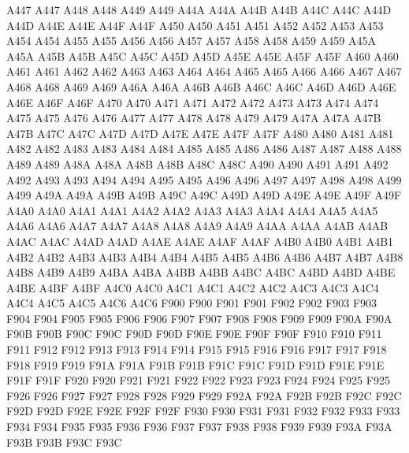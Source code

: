 \ID A447 A447
\ID A448 A448
\ID A449 A449
\ID A44A A44A
\ID A44B A44B
\ID A44C A44C
\ID A44D A44D
\ID A44E A44E
\ID A44F A44F
\ID A450 A450
\ID A451 A451
\ID A452 A452
\ID A453 A453
\ID A454 A454
\ID A455 A455
\ID A456 A456
\ID A457 A457
\ID A458 A458
\ID A459 A459
\ID A45A A45A
\ID A45B A45B
\ID A45C A45C
\ID A45D A45D
\ID A45E A45E
\ID A45F A45F
\ID A460 A460
\ID A461 A461
\ID A462 A462
\ID A463 A463
\ID A464 A464
\ID A465 A465
\ID A466 A466
\ID A467 A467
\ID A468 A468
\ID A469 A469
\ID A46A A46A
\ID A46B A46B
\ID A46C A46C
\ID A46D A46D
\ID A46E A46E
\ID A46F A46F
\ID A470 A470
\ID A471 A471
\ID A472 A472
\ID A473 A473
\ID A474 A474
\ID A475 A475
\ID A476 A476
\ID A477 A477
\ID A478 A478
\ID A479 A479
\ID A47A A47A
\ID A47B A47B
\ID A47C A47C
\ID A47D A47D
\ID A47E A47E
\ID A47F A47F
\ID A480 A480
\ID A481 A481
\ID A482 A482
\ID A483 A483
\ID A484 A484
\ID A485 A485
\ID A486 A486
\ID A487 A487
\ID A488 A488
\ID A489 A489
\ID A48A A48A
\ID A48B A48B
\ID A48C A48C
\ID A490 A490
\ID A491 A491
\ID A492 A492
\ID A493 A493
\ID A494 A494
\ID A495 A495
\ID A496 A496
\ID A497 A497
\ID A498 A498
\ID A499 A499
\ID A49A A49A
\ID A49B A49B
\ID A49C A49C
\ID A49D A49D
\ID A49E A49E
\ID A49F A49F
\ID A4A0 A4A0
\ID A4A1 A4A1
\ID A4A2 A4A2
\ID A4A3 A4A3
\ID A4A4 A4A4
\ID A4A5 A4A5
\ID A4A6 A4A6
\ID A4A7 A4A7
\ID A4A8 A4A8
\ID A4A9 A4A9
\ID A4AA A4AA
\ID A4AB A4AB
\ID A4AC A4AC
\ID A4AD A4AD
\ID A4AE A4AE
\ID A4AF A4AF
\ID A4B0 A4B0
\ID A4B1 A4B1
\ID A4B2 A4B2
\ID A4B3 A4B3
\ID A4B4 A4B4
\ID A4B5 A4B5
\ID A4B6 A4B6
\ID A4B7 A4B7
\ID A4B8 A4B8
\ID A4B9 A4B9
\ID A4BA A4BA
\ID A4BB A4BB
\ID A4BC A4BC
\ID A4BD A4BD
\ID A4BE A4BE
\ID A4BF A4BF
\ID A4C0 A4C0
\ID A4C1 A4C1
\ID A4C2 A4C2
\ID A4C3 A4C3
\ID A4C4 A4C4
\ID A4C5 A4C5
\ID A4C6 A4C6
\ID F900 F900
\ID F901 F901
\ID F902 F902
\ID F903 F903
\ID F904 F904
\ID F905 F905
\ID F906 F906
\ID F907 F907
\ID F908 F908
\ID F909 F909
\ID F90A F90A
\ID F90B F90B
\ID F90C F90C
\ID F90D F90D
\ID F90E F90E
\ID F90F F90F
\ID F910 F910
\ID F911 F911
\ID F912 F912
\ID F913 F913
\ID F914 F914
\ID F915 F915
\ID F916 F916
\ID F917 F917
\ID F918 F918
\ID F919 F919
\ID F91A F91A
\ID F91B F91B
\ID F91C F91C
\ID F91D F91D
\ID F91E F91E
\ID F91F F91F
\ID F920 F920
\ID F921 F921
\ID F922 F922
\ID F923 F923
\ID F924 F924
\ID F925 F925
\ID F926 F926
\ID F927 F927
\ID F928 F928
\ID F929 F929
\ID F92A F92A
\ID F92B F92B
\ID F92C F92C
\ID F92D F92D
\ID F92E F92E
\ID F92F F92F
\ID F930 F930
\ID F931 F931
\ID F932 F932
\ID F933 F933
\ID F934 F934
\ID F935 F935
\ID F936 F936
\ID F937 F937
\ID F938 F938
\ID F939 F939
\ID F93A F93A
\ID F93B F93B
\ID F93C F93C
